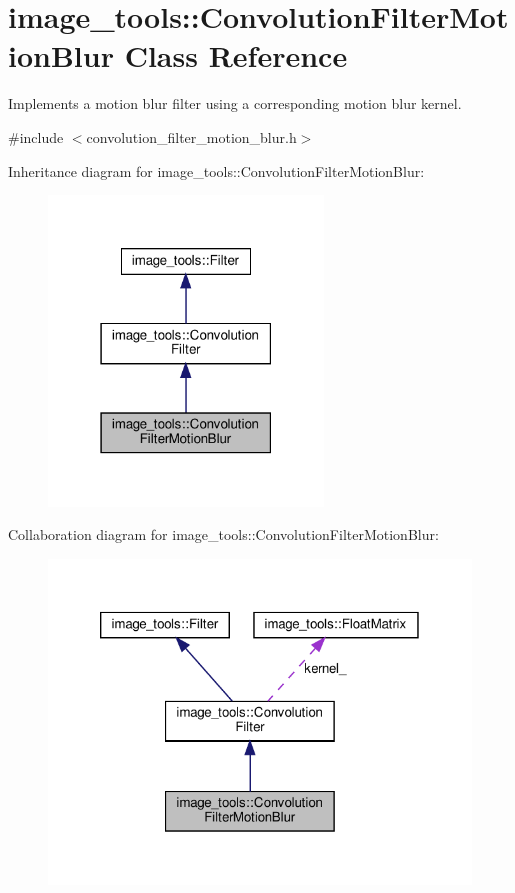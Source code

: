 \hypertarget{classimage__tools_1_1ConvolutionFilterMotionBlur}{}\section{image\+\_\+tools\+:\+:Convolution\+Filter\+Motion\+Blur Class Reference}
\label{classimage__tools_1_1ConvolutionFilterMotionBlur}


Implements a motion blur filter using a corresponding motion blur kernel.  




{\ttfamily \#include $<$convolution\+\_\+filter\+\_\+motion\+\_\+blur.\+h$>$}



Inheritance diagram for image\+\_\+tools\+:\+:Convolution\+Filter\+Motion\+Blur\+:
\nopagebreak
\begin{figure}[H]
\begin{center}
\leavevmode
\includegraphics[width=207pt]{classimage__tools_1_1ConvolutionFilterMotionBlur__inherit__graph}
\end{center}
\end{figure}


Collaboration diagram for image\+\_\+tools\+:\+:Convolution\+Filter\+Motion\+Blur\+:
\nopagebreak
\begin{figure}[H]
\begin{center}
\leavevmode
\includegraphics[width=320pt]{classimage__tools_1_1ConvolutionFilterMotionBlur__coll__graph}
\end{center}
\end{figure}

